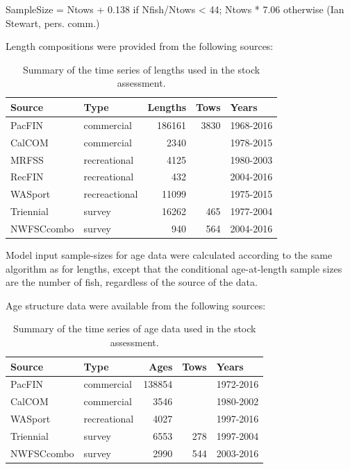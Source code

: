 \documentclass[12pt,]{article}
\begin{document}
SampleSize = Ntows + 0.138 if Nfish/Ntows \textless{} 44; Ntows * 7.06
otherwise (Ian Stewart, pers. comm.)

Length compositions were provided from the following sources:

\begin{table}[ht]
\centering
\caption{Summary of the time series of lengths used in the stock assessment.} 
\label{tab:Length_sources}
\begin{tabular}{llrrl}
  \hline
Source & Type & Lengths & Tows & Years \\ 
  \hline
PacFIN & commercial & 186161 & 3830 & 1968-2016 \\ 
  CalCOM & commercial & 2340 &  & 1978-2015 \\ 
  MRFSS & recreational & 4125 &  & 1980-2003 \\ 
  RecFIN & recreational & 432 &  & 2004-2016 \\ 
  WASport & recreactional & 11099 &  & 1975-2015 \\ 
  Triennial & survey & 16262 & 465 & 1977-2004 \\ 
  NWFSCcombo & survey & 940 & 564 & 2004-2016 \\ 
   \hline
\end{tabular}
\end{table}

Model input sample-sizes for age data were calculated according to the
same algorithm as for lengths, except that the conditional age-at-length
sample sizes are the number of fish, regardless of the source of the
data.

Age structure data were available from the following sources:

\begin{table}[ht]
\centering
\caption{Summary of the
                                              time series of age data used in the stock
                                              assessment.} 
\label{tab:Age_sources}
\begin{tabular}{llrrl}
  \hline
Source & Type & Ages & Tows & Years \\ 
  \hline
PacFIN & commercial & 138854 &  & 1972-2016 \\ 
  CalCOM & commercial & 3546 &  & 1980-2002 \\ 
  WASport & recreational & 4027 &  & 1997-2016 \\ 
  Triennial & survey & 6553 & 278 & 1997-2004 \\ 
  NWFSCcombo & survey & 2990 & 544 & 2003-2016 \\ 
   \hline
\end{tabular}
\end{table}
\end{document}
